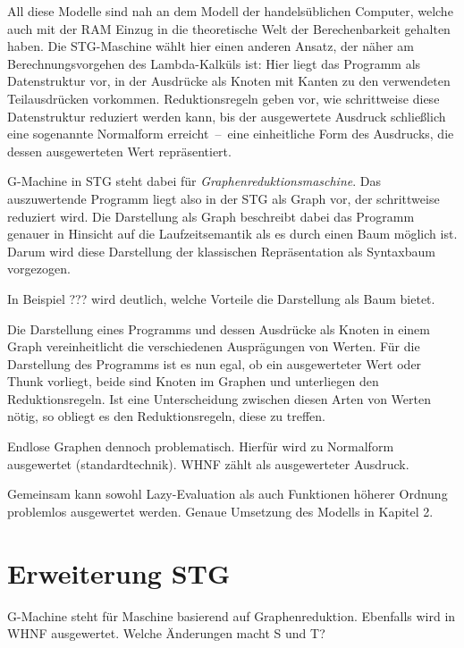 All diese Modelle sind nah an dem Modell der handelsüblichen Computer, welche auch mit der RAM Einzug in die theoretische Welt der Berechenbarkeit gehalten haben.
Die STG-Maschine wählt hier einen anderen Ansatz, der näher am Berechnungsvorgehen des Lambda-Kalküls ist:
Hier liegt das Programm als Datenstruktur vor, in der Ausdrücke als Knoten mit Kanten zu den verwendeten Teilausdrücken vorkommen.
Reduktionsregeln geben vor, wie schrittweise diese Datenstruktur reduziert werden kann, bis der ausgewertete Ausdruck schließlich eine sogenannte Normalform erreicht~--~eine einheitliche Form des Ausdrucks, die dessen ausgewerteten Wert repräsentiert.

G-Machine in STG steht dabei für \textit{Graphenreduktionsmaschine}.
Das auszuwertende Programm liegt also in der STG als Graph vor, der schrittweise reduziert wird.
Die Darstellung als Graph beschreibt dabei das Programm genauer in Hinsicht auf die Laufzeitsemantik als es durch einen Baum möglich ist.
Darum wird diese Darstellung der klassischen Repräsentation als Syntaxbaum vorgezogen.

In Beispiel ??? wird deutlich, welche Vorteile die Darstellung als Baum bietet.


Die Darstellung eines Programms und dessen Ausdrücke als Knoten in einem Graph vereinheitlicht die verschiedenen Ausprägungen von Werten.
Für die Darstellung des Programms ist es nun egal, ob ein ausgewerteter Wert oder Thunk vorliegt, beide sind Knoten im Graphen und unterliegen den Reduktionsregeln.
Ist eine Unterscheidung zwischen diesen Arten von Werten nötig, so obliegt es den Reduktionsregeln, diese zu treffen.


Endlose Graphen dennoch problematisch.
Hierfür wird zu Normalform ausgewertet (standardtechnik).
WHNF zählt als ausgewerteter Ausdruck.


Gemeinsam kann sowohl Lazy-Evaluation als auch Funktionen höherer Ordnung problemlos ausgewertet werden.
Genaue Umsetzung des Modells in Kapitel 2.


\section{Erweiterung STG}

G-Machine steht für Maschine basierend auf Graphenreduktion.
Ebenfalls wird in WHNF ausgewertet.
Welche Änderungen macht S und T?

